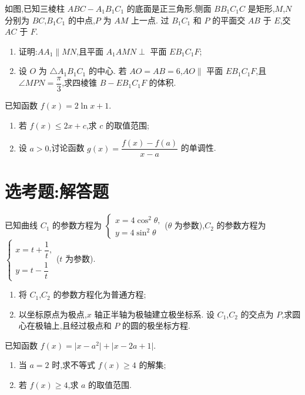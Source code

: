 \begin{problem}
如图,已知三棱柱 \(ABC-A_1B_1C_1\) 的底面是正三角形,侧面 \(BB_1C_1C\) 是矩形,\(M\),\(N\) 分别为 \(BC\),\(B_1C_1\) 的中点,\(P\) 为 \(AM\) 上一点. 过 \(B_1C_1\) 和 \(P\) 的平面交 \(AB\) 于 \(E\),交 \(AC\) 于 \(F\).

\begin{enumerate}
\item 证明:\(AA_1\parallel MN\),且平面 \(A_1AMN\perp\) 平面 \(EB_1C_1F\);
\item 设 \(O\) 为 \(\triangle A_1B_1C_1\) 的中心. 若 \(AO=AB=6\),\(AO\parallel\) 平面 \(EB_1C_1F\),且 \(\angle MPN=\dfrac{\pi}{3}\),求四棱锥 \(B-EB_1C_1F\) 的体积.
\end{enumerate}

\end{problem}

\begin{problem}
已知函数 \(f(x)=2\ln x+1\).

\begin{enumerate}
\item 若 \(f(x)\le 2x+c\),求 \(c\) 的取值范围;
\item 设 \(a>0\),讨论函数 \(g(x)=\dfrac{f(x)-f(a)}{x-a}\) 的单调性.
\end{enumerate}
\end{problem}

\section{选考题:解答题}

\begin{problem}
已知曲线 \(C_1\) 的参数方程为
\(\begin{cases}
x=4\cos^2\theta,\\
y=4\sin^2\theta
\end{cases}\)(\(\theta\) 为参数),\(C_2\) 的参数方程为
\(\begin{cases}
x=t+\dfrac{1}{t},\\
y=t-\dfrac{1}{t}
\end{cases}\)(\(t\) 为参数).

\begin{enumerate}
\item 将 \(C_1\),\(C_2\) 的参数方程化为普通方程;
\item 以坐标原点为极点,\(x\) 轴正半轴为极轴建立极坐标系. 设 \(C_1\),\(C_2\) 的交点为 \(P\),求圆心在极轴上,且经过极点和 \(P\) 的圆的极坐标方程.
\end{enumerate}
\end{problem}

\begin{problem}
已知函数 \(f(x)=\lvert x-a^2\rvert+\lvert x-2a+1\rvert\).

\begin{enumerate}
\item 当 \(a=2\) 时,求不等式 \(f(x)\ge 4\) 的解集;
\item 若 \(f(x)\ge 4\),求 \(a\) 的取值范围.
\end{enumerate}
\end{problem}

